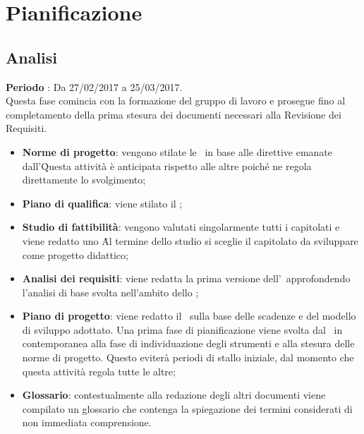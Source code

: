 \documentclass[../PianoDiProgetto.tex]{subfiles}
\begin{document}
	\section{Pianificazione}
	
		\subsection{Analisi}
		\textbf{Periodo} : Da 27/02/2017 a 25/03/2017. \\
		Questa fase comincia con la formazione del gruppo di lavoro e prosegue fino al completamento della prima stesura dei documenti necessari alla Revisione dei Requisiti.
		\begin{itemize}
			\item \textbf{Norme di progetto}: vengono stilate le \normediprogetto\ in base alle direttive emanate 
			dall'\amministratore\. Questa attività è anticipata rispetto alle altre poiché ne regola direttamente lo svolgimento;
			\item \textbf{Piano di qualifica}: viene stilato il  \pianodiqualifica ;
			\item \textbf{Studio di fattibilità}: vengono valutati singolarmente tutti i capitolati e viene redatto uno \studiodifattibilita\. Al termine dello studio si sceglie il capitolato da sviluppare come progetto didattico;
			\item \textbf{Analisi dei requisiti}: viene redatta la prima versione dell'\analisideirequisiti\ approfondendo l'analisi di base svolta nell'ambito dello \studiodifattibilita ;
			\item \textbf{Piano di progetto}: viene redatto il \pianodiprogetto\ sulla base delle scadenze e del modello di sviluppo adottato. Una prima fase di pianificazione viene svolta dal \responsabilediprogetto\ in contemporanea alla fase di individuazione degli strumenti e alla stesura delle norme di progetto. Questo eviterà periodi di stallo iniziale, dal momento che questa attività regola tutte le altre;
			\item \textbf{Glossario}: contestualmente alla redazione degli altri documenti viene compilato un glossario che contenga la spiegazione dei termini considerati di non immediata comprensione.
		\end{itemize}
\end{document}
